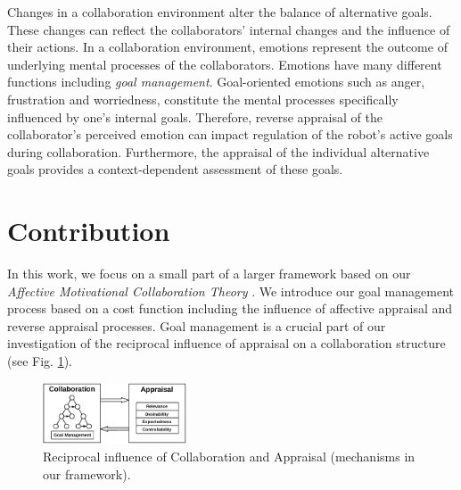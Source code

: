 \documentclass[conference]{IEEEtran}
\begin{document}
Changes in a collaboration environment alter the balance of alternative goals.
These changes can reflect the collaborators' internal changes and the influence
of their actions. In a collaboration environment, emotions represent the outcome
of underlying mental processes of the collaborators. Emotions have many
different functions \cite{scheutz:architectural-action-selection} including
\textit{goal management}. Goal-oriented emotions such as anger, frustration and
worriedness, constitute the mental processes specifically influenced by one's
internal goals. Therefore, reverse appraisal \cite{gratch:reverse-appraisal} of
the collaborator's perceived emotion can impact regulation of the robot's active
goals during collaboration. Furthermore, the appraisal of the individual
alternative goals provides a context-dependent assessment of these goals. 

\vspace*{-3mm}
\section{Contribution}
\vspace*{-2mm}
In this work, we focus on a small part of a larger framework based on our
\textit{Affective Motivational Collaboration Theory}
\cite{shayganfar:amct-symbiotic}. We introduce our goal management process based
on a cost function including the influence of affective appraisal and reverse
appraisal processes. Goal management is a crucial part of our investigation of
the reciprocal influence of appraisal on a collaboration structure (see Fig.
\ref{fig:actionSelection}).

\begin{figure}[tbh]
  \centering
  \includegraphics[width=0.38\textwidth]{figure/ActionSelection-croped.pdf}
  \vspace*{-2mm}
  \caption{{\fontsize{9}{9}\selectfont Reciprocal influence of Collaboration
  and Appraisal (mechanisms in our framework).}}
  \label{fig:actionSelection}
  \vspace*{-6mm}
\end{figure}
\end{document}
